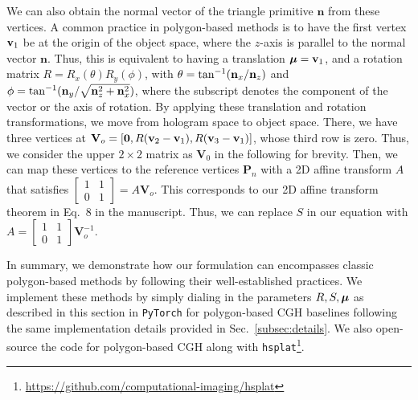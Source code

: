 We can also obtain the normal vector of the triangle primitive $\mathbf{n}$ from these vertices. A common practice in polygon-based methods is to have the first vertex $\mathbf{v}_1$ be at the origin of the object space, where the $z$-axis is parallel to the normal vector $\mathbf{n}$. Thus, this is equivalent to having a translation $\bm{\mu} = \mathbf{v}_1$, and a rotation matrix $R = R_x(\theta)R_y(\phi)$, with $\theta = \tan^{-1}(\mathbf{n}_x / \mathbf{n}_z)$ and $\phi = \tan^{-1}(\mathbf{n}_y / \sqrt{\mathbf{n}_z^2 + \mathbf{n}_x^2})$, where the subscript denotes the component of the vector or the axis of rotation. By applying these translation and rotation transformations, we move from hologram space to object space. There, we have three vertices at $\mathbf{V}_o = [\mathbf{0}, R(\mathbf{v}_2 - \mathbf{v}_1), R(\mathbf{v}_3 - \mathbf{v}_1)]$, whose third row is zero. Thus, we consider the upper $2\times2$ matrix as $\mathbf{V}_0$ in the following for brevity. Then, we can map these vertices to the reference vertices $\mathbf{P}_n$ with a 2D affine transform $A$ that satisfies $\begin{bmatrix} 1 & 1 \\
    0 & 1 \end{bmatrix} = A \mathbf{V}_o$. This corresponds to our 2D affine transform theorem in Eq.~8 in the manuscript. Thus, we can replace $S$ in our equation with $A=\begin{bmatrix} 1 & 1 \\
    0 & 1 \end{bmatrix} \mathbf{V}_o^{-1}$.


  In summary, we demonstrate how our formulation can encompasses classic polygon-based methods by following their well-established practices. We implement these methods by simply dialing in the parameters $R, S, {\bm{\mu}}$ as described in this section in \texttt{PyTorch} for polygon-based CGH baselines following the same implementation details provided in Sec.~\ref{subsec:details}. We also open-source the code for polygon-based CGH along with \texttt{hsplat}\footnote{\href{https://github.com/computational-imaging/hsplat}{https://github.com/computational-imaging/hsplat}}.






